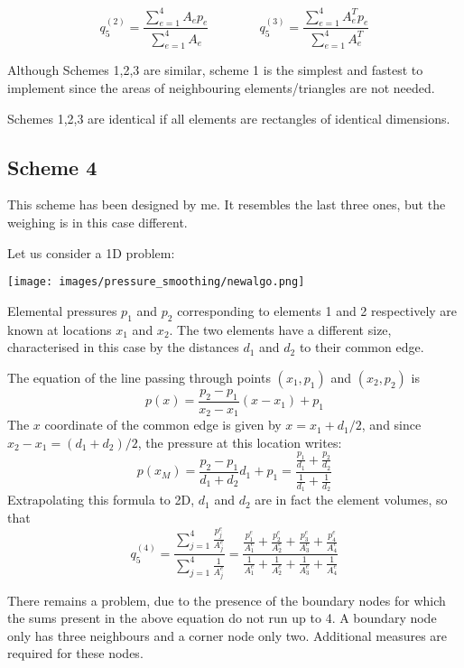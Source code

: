 \[
q_5^{(2)} = \frac{\sum\limits_{e=1}^4 A_e p_e}{\sum\limits_{e=1}^4 A_e}
\qquad
\qquad
q_5^{(3)} = \frac{\sum\limits_{e=1}^4 A_e^T p_e}{\sum\limits_{e=1}^4 A_e^T}
\] 


\begin{remark} Although Schemes 1,2,3 are similar, scheme 1 is the simplest and fastest
to implement since the areas of neighbouring elements/triangles are not needed.
\end{remark}

\begin{remark} 
Schemes 1,2,3 are identical if all elements are rectangles of identical dimensions.
\end{remark}


\subsection{Scheme 4} 

This scheme has been designed by me. 
It resembles the last three ones, but the weighing is in this case different.

Let us consider a 1D problem:
\begin{center}
\texttt{[image: images/pressure\_smoothing/newalgo.png]}
\end{center}

Elemental pressures $p_1$ and $p_2$ corresponding to elements 1 and 2 respectively are known at
locations $x_1$ and $x_2$. The two elements have a different size, characterised in this case
by the distances $d_1$ and $d_2$ to their common edge.

The equation of the line passing through points $(x_1,p_1)$ and $(x_2,p_2)$ is 
\[
p(x)=\frac{p_2-p_1}{x_2-x_1}(x-x_1)+p_1
\]
The $x$ coordinate of the common edge is given by $x=x_1+d_1/2$, 
and since $x_2-x_1=(d_1+d_2)/2$, the 
pressure at this location writes:
\[
p(x_M)= \frac{p_2-p_1}{d_1+d_2}d_1+p_1 = \frac{\frac{p_1}{d_1} + \frac{p_2}{d_2}}{\frac{1}{d_1} + \frac{1}{d_2}}
\]
Extrapolating this formula to 2D, $d_1$ and $d_2$ are in fact the element volumes, so that
\[
q_5^{(4)} = 
\frac{\sum\limits_{j=1}^4 \frac{p_j^e}{A_j^e}}{\sum\limits_{j=1}^4 \frac{1}{A_j^e}}
=
\frac{
\frac{p_1^e}{A_1^e}+
\frac{p_2^e}{A_2^e}+
\frac{p_3^e}{A_3^e}+
\frac{p_4^e}{A_4^e}
}{
\frac{1}{A_1^e}+
\frac{1}{A_2^e}+
\frac{1}{A_3^e}+
\frac{1}{A_4^e}
}\]

There remains a problem, due to the presence of the boundary nodes for which 
the sums present in the above equation do not run up to 4. A boundary
node only has three neighbours and a corner node only two. Additional measures
are required for these nodes. 

